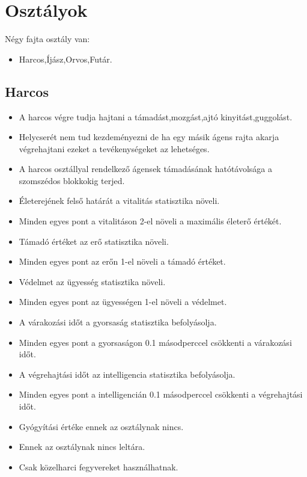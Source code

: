 \section{Osztályok}

Négy fajta osztály van:
\begin{itemize}
\item Harcos,Íjász,Orvos,Futár.
\end{itemize}

\subsection{Harcos}
\begin{itemize}
 \item A harcos végre tudja hajtani a támadást,mozgást,ajtó kinyitást,guggolást.
 \item Helycserét nem tud kezdeményezni de ha egy másik ágens rajta akarja végrehajtani ezeket a tevékenységeket az lehetséges.
 \item A harcos osztállyal rendelkező ágensek támadásának hatótávolsága a szomszédos blokkokig terjed.
 \item Életerejének felső határát a vitalitás statisztika növeli.
 \item Minden egyes pont a vitalitáson 2-el növeli a maximális életerő értékét.
 \item Támadó értéket az erő statisztika növeli.
 \item Minden egyes pont az erőn 1-el növeli a támadó értéket.
 \item Védelmet az ügyesség statisztika növeli.
 \item Minden egyes pont az ügyességen 1-el növeli a védelmet.
 \item A várakozási időt a gyorsaság statisztika befolyásolja.
 \item Minden egyes pont a gyorsaságon 0.1 másodperccel csökkenti a várakozási időt.
 \item A végrehajtási időt az intelligencia statisztika befolyásolja.
 \item Minden egyes pont a intelligencián 0.1 másodperccel csökkenti a végrehajtási időt.
 \item Gyógyítási értéke ennek az osztálynak nincs.
 \item Ennek az osztálynak nincs leltára.
 \item Csak közelharci fegyvereket használhatnak.
\end{itemize}

